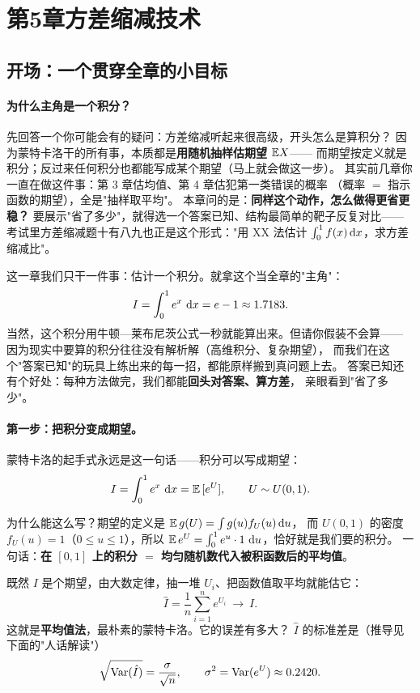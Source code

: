 \section{第5章\quad 方差缩减技术}

\subsection{开场：一个贯穿全章的小目标}

\paragraph{为什么主角是一个积分？}
先回答一个你可能会有的疑问：方差缩减听起来很高级，开头怎么是算积分？
因为蒙特卡洛干的所有事，本质都是\textbf{用随机抽样估期望} $\mathbb{E} X$——
而期望按定义就是积分；反过来任何积分也都能写成某个期望（马上就会做这一步）。
其实前几章你一直在做这件事：第 3 章估均值、第 4 章估犯第一类错误的概率
（概率 $=$ 指示函数的期望），全是"抽样取平均"。
本章问的是：\textbf{同样这个动作，怎么做得更省更稳？}
要展示"省了多少"，就得选一个答案已知、结构最简单的靶子反复对比——
考试里方差缩减题十有八九也正是这个形式："用 XX 法估计 $\int_0^1f(x)\,\mathrm{d} x$，求方差缩减比"。

这一章我们只干一件事：估计一个积分。就拿这个当全章的"主角"：
\[
I=\int_0^1 e^x\,\,\mathrm{d} x = e-1\approx 1.7183 .
\]
当然，这个积分用牛顿—莱布尼茨公式一秒就能算出来。但请你假装不会算——
因为现实中要算的积分往往没有解析解（高维积分、复杂期望），
而我们在这个"答案已知"的玩具上练出来的每一招，都能原样搬到真问题上去。
答案已知还有个好处：每种方法做完，我们都能\textbf{回头对答案、算方差}，
亲眼看到"省了多少"。

\paragraph{第一步：把积分变成期望。}
蒙特卡洛的起手式永远是这一句话——积分可以写成期望：
\[
I=\int_0^1 e^x\,\,\mathrm{d} x=\mathbb{E}\,[e^U],\qquad U\sim U(0,1).
\]

\begin{pbox}
为什么能这么写？期望的定义是 $\mathbb{E}\,g(U)=\int g(u)f_U(u)\,\mathrm{d} u$，
而 $U(0,1)$ 的密度 $f_U(u)=1$（$0\le u\le1$），所以
$\mathbb{E}\,e^U=\int_0^1 e^u\cdot1\,\,\mathrm{d} u$，恰好就是我们要的积分。
一句话：\textbf{在 $[0,1]$ 上的积分 $=$ 均匀随机数代入被积函数后的平均值}。
\end{pbox}

既然 $I$ 是个期望，由大数定律，抽一堆 $U_i$、把函数值取平均就能估它：
\[
\hat I=\frac1n\sum_{i=1}^n e^{U_i}\ \longrightarrow\ I .
\]
这就是\textbf{平均值法}，最朴素的蒙特卡洛。它的误差有多大？
$\hat I$ 的标准差是（推导见下面的"人话解读"）
\[
\sqrt{\mathrm{Var}(\hat I)}=\frac{\sigma}{\sqrt n},\qquad \sigma^2=\mathrm{Var}(e^U)\approx0.2420 .
\]

